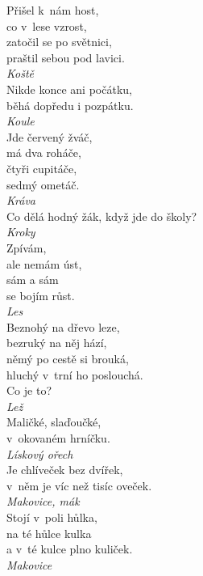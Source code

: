 \begin{multicols}{\value{columnsthindata}}
\noindent
Přišel k~nám host,\\
co v~lese vzrost,\\
zatočil se po světnici,\\
praštil sebou pod lavici.\\[1 mm]
{\sl Koště}\\

\noindent
Nikde konce ani počátku,\\
běhá dopředu i pozpátku.\\[1 mm]
{\sl Koule}\\

\noindent
Jde červený žváč,\\
má dva roháče,\\
čtyři cupitáče,\\
sedmý ometáč.\\[1 mm]
{\sl Kráva}\\

\noindent
Co dělá hodný žák, když jde do školy?\\[1 mm]
{\sl Kroky}\\

\noindent
Zpívám,\\
ale nemám úst,\\
sám a sám\\
se bojím růst.\\[1 mm]
{\sl Les}\\

\noindent
Beznohý na dřevo leze,\\
bezruký na něj hází,\\
němý po cestě si brouká,\\
hluchý v~trní ho poslouchá.\\
Co je to?\\[1 mm]
{\sl Lež}\\

\noindent
Maličké, slaďoučké,\\
v~okovaném hrníčku.\\[1 mm]
{\sl Lískový ořech}\\

\noindent
Je chlíveček bez dvířek,\\
v~něm je víc než tisíc oveček.\\[1 mm]
{\sl Makovice, mák}\\

\noindent
Stojí v~poli hůlka,\\
na té hůlce kulka\\
a v~té kulce plno kuliček.\\[1 mm]
{\sl Makovice}\\


\end{multicols}
